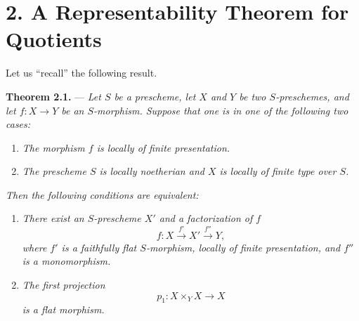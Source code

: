 

%
\section*{2. A Representability Theorem for Quotients}

Let us ``recall'' the following result.

\medskip
\noindent{}%
\textbf{Theorem 2.1.} --- \textit{Let \(S\) be a prescheme, let
\(X\) and \(Y\) be two \(S\)-preschemes, and let
\(f:X\to Y\) be an \(S\)-morphism. Suppose that one is in one of the
following two cases:}

\begin{enumerate}
\renewcommand{\labelenumi}{\textit{\alph{enumi})}}
\item \textit{The morphism \(f\) is locally of finite presentation.}

\item \textit{The prescheme \(S\) is locally noetherian and \(X\) is
locally of finite type over \(S\).}
\end{enumerate}

\noindent\textit{Then the following conditions are equivalent:}

\begin{enumerate}
\renewcommand{\labelenumi}{\textit{\roman{enumi})}}
\item \textit{There exist an \(S\)-prescheme \(X'\) and a
factorization of \(f\)}
\[
  f:X\xrightarrow{\,f'\,}X'\xrightarrow{\,f''\,}Y,
\]
\textit{where \(f'\) is a faithfully flat \(S\)-morphism, locally
of finite presentation, and \(f''\) is a monomorphism.}

\item \textit{The first projection}
\[
  p_1:X\times_Y X\longrightarrow X
\]
\textit{is a flat morphism.}
\end{enumerate}

